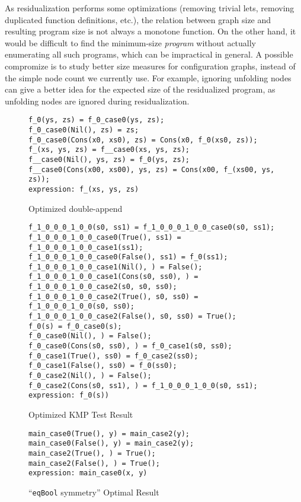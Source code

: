 \documentclass[submission,copyright,creativecommons]{eptcs}
\begin{document}
\begin{itemize}
    As residualization performs some optimizations (removing trivial lets, removing duplicated
    function definitions, etc.), the relation between graph size and resulting program size
    is not always a monotone function.
    On the other hand, it would be difficult to find the minimum-size \emph{program}
    without actually enumerating all such programs, which can be impractical in general.
    A possible compromize is to study better size measures for configuration graphs, instead
    of the simple node count we currently use.
    For example, ignoring unfolding nodes can give a better idea for the expected size
    of the residualized program, as unfolding nodes are ignored during residualization.
    
\end{itemize}

\begin{figure}
\begin{lstlisting}
f_0(ys, zs) = f_0_case0(ys, zs);
f_0_case0(Nil(), zs) = zs;
f_0_case0(Cons(x0, xs0), zs) = Cons(x0, f_0(xs0, zs));
f_(xs, ys, zs) = f__case0(xs, ys, zs);
f__case0(Nil(), ys, zs) = f_0(ys, zs);
f__case0(Cons(x00, xs00), ys, zs) = Cons(x00, f_(xs00, ys, zs));
expression: f_(xs, ys, zs)
\end{lstlisting}
\caption{Optimized double-append}
\label{fig:DoubleAppResult}
\end{figure}

\begin{figure}
\begin{lstlisting}
f_1_0_0_0_1_0_0(s0, ss1) = f_1_0_0_0_1_0_0_case0(s0, ss1);
f_1_0_0_0_1_0_0_case0(True(), ss1) = f_1_0_0_0_1_0_0_case1(ss1);
f_1_0_0_0_1_0_0_case0(False(), ss1) = f_0(ss1);
f_1_0_0_0_1_0_0_case1(Nil(), ) = False();
f_1_0_0_0_1_0_0_case1(Cons(s0, ss0), ) = f_1_0_0_0_1_0_0_case2(s0, s0, ss0);
f_1_0_0_0_1_0_0_case2(True(), s0, ss0) = f_1_0_0_0_1_0_0(s0, ss0);
f_1_0_0_0_1_0_0_case2(False(), s0, ss0) = True();
f_0(s) = f_0_case0(s);
f_0_case0(Nil(), ) = False();
f_0_case0(Cons(s0, ss0), ) = f_0_case1(s0, ss0);
f_0_case1(True(), ss0) = f_0_case2(ss0);
f_0_case1(False(), ss0) = f_0(ss0);
f_0_case2(Nil(), ) = False();
f_0_case2(Cons(s0, ss1), ) = f_1_0_0_0_1_0_0(s0, ss1);
expression: f_0(s))
\end{lstlisting}
\caption{Optimized KMP Test Result}
\label{fig:KMPResult}
\end{figure}

\begin{figure}
\begin{lstlisting}
main_case0(True(), y) = main_case2(y);
main_case0(False(), y) = main_case2(y);
main_case2(True(), ) = True();
main_case2(False(), ) = True();
expression: main_case0(x, y)
\end{lstlisting}
\caption{``\texttt{eqBool} symmetry'' Optimal Result}
\label{fig:BoolEqSymResult}
\end{figure}
\end{document}
